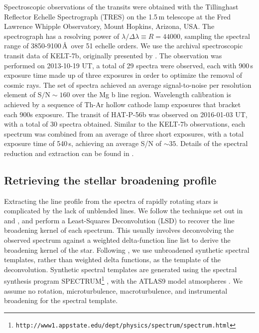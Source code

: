 \documentclass[useAMS,usenatbib]{mn2e}
\begin{document}
Spectroscopic observations of the transits were obtained with the Tillinghast Reflector Echelle Spectrograph (TRES) on the 1.5\,m telescope at the Fred Lawrence Whipple Observatory, Mount Hopkins, Arizona, USA. The spectrograph has a resolving power of $\lambda / \Delta \lambda \equiv R = 44000$, sampling the spectral range of 3850-9100\,\AA\, over 51 echelle orders. We use the archival spectroscopic transit data of KELT-7b, originally presented by \citet{2015AJ....150...12B}. The observation was performed on 2013-10-19 UT, a total of 29 spectra were observed, each with 900\,s exposure time made up of three exposures in order to optimize the removal of cosmic rays. The set of spectra achieved an average signal-to-noise per resolution element of $\text{S/N} \sim 160$ over the Mg b line region. Wavelength calibration is achieved by a sequence of Th-Ar hollow cathode lamp exposures that bracket each 900s exposure. The transit of HAT-P-56b was observed on 2016-01-03 UT, with a total of 30 spectra obtained. Similar to the KELT-7b observations, each spectrum was combined from an average of three short exposures, with a total exposure time of 540\,s, achieving an average S/N of $\sim35$. Details of the spectral reduction and extraction can be found in \citet{2010ApJ...720.1118B}.

\subsection{Retrieving the stellar broadening profile}
\label{sec:lsd}

Extracting the line profile from the spectra of rapidly rotating stars is complicated by the lack of unblended lines. We follow the technique set out in \citet{1997MNRAS.291..658D} and \citet{2010MNRAS.407..507C}, and perform a Least-Squares Deconvolution (LSD) to recover the line broadening kernel of each spectrum. This usually involves deconvolving the observed spectrum against a weighted delta-function line list to derive the broadening kernel of the star. Following \citet{2015AJ....150..197H}, we use unbroadened synthetic spectral templates, rather than weighted delta functions, as the template of the deconvolution. Synthetic spectral templates are generated using the spectral synthesis program SPECTRUM\footnote{\texttt{http://www1.appstate.edu/dept/physics/spectrum/spectrum.html}} \citep{1994AJ....107..742G}, with the ATLAS9 model atmospheres \citep{2004astro.ph..5087C}. We assume no rotation, microturbulence, macroturbulence, and instrumental broadening for the spectral template. 
\end{document}
